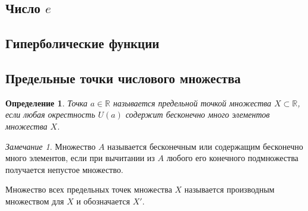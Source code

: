 \documentclass[a4paper,12pt]{article} %
\newtheorem{definition}{Определение}[subsection]
\theoremstyle{remark}
\newtheorem*{remark}{Замечание}
\begin{document}
\subsection{Число $e$}

\subsection{Гиперболические функции}
\subsection{Предельные точки числового множества}
\begin{definition}
	Точка $a\in \mathbb{R}$ называется предельной точкой множества $X\subset \mathbb{R}$, если любая окрестность $U(a)$ содержит бесконечно много элементов множества $X$.
\end{definition}
\begin{remark}
	Множество $A$ называется бесконечным или содержащим бесконечно много элементов, если при вычитании из $A$ любого его конечного подмножества получается непустое множество.
\end{remark}

Множество всех предельных точек множества $X$ называется производным множеством для $X$ и обозначается $X'$.
\end{document}
